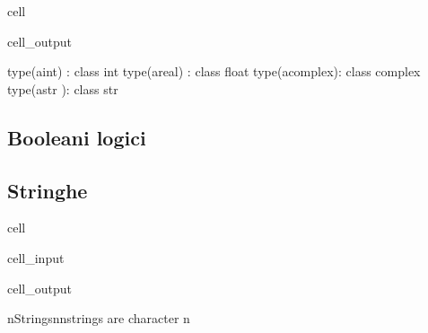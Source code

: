 \documentclass[letterpaper,10pt,italian]{jupyterBook}
\begin{document}
\begin{sphinxuseclass}{cell}
\begin{sphinxVerbatimOutput}
\begin{sphinxuseclass}{cell_output}
\begin{sphinxVerbatim}[commandchars=\\\{\}]
type(a\PYGZus{}int)    : \PYGZlt{}class \PYGZsq{}int\PYGZsq{}\PYGZgt{}
type(a\PYGZus{}real)   : \PYGZlt{}class \PYGZsq{}float\PYGZsq{}\PYGZgt{}
type(a\PYGZus{}complex): \PYGZlt{}class \PYGZsq{}complex\PYGZsq{}\PYGZgt{}
type(a\PYGZus{}str    ): \PYGZlt{}class \PYGZsq{}str\PYGZsq{}\PYGZgt{}
\end{sphinxVerbatim}

\end{sphinxuseclass}\end{sphinxVerbatimOutput}

\end{sphinxuseclass}

\subsection{Booleani \sphinxhyphen{} logici}
\label{\detokenize{ch/programming/types:booleani-logici}}

\subsection{Stringhe}
\label{\detokenize{ch/programming/types:stringhe}}
\begin{sphinxuseclass}{cell}\begin{sphinxVerbatimInput}

\begin{sphinxuseclass}{cell_input}
\begin{sphinxVerbatim}[commandchars=\\\{\}]

\end{sphinxVerbatim}

\end{sphinxuseclass}\end{sphinxVerbatimInput}
\begin{sphinxVerbatimOutput}

\begin{sphinxuseclass}{cell_output}
\begin{sphinxVerbatim}[commandchars=\\\{\}]
\PYGZsq{}\PYGZbs{}nStrings\PYGZbs{}n\PYGZbs{}nstrings are character \PYGZbs{}n\PYGZsq{}
\end{sphinxVerbatim}

\end{sphinxuseclass}\end{sphinxVerbatimOutput}

\end{sphinxuseclass}
\end{document}
